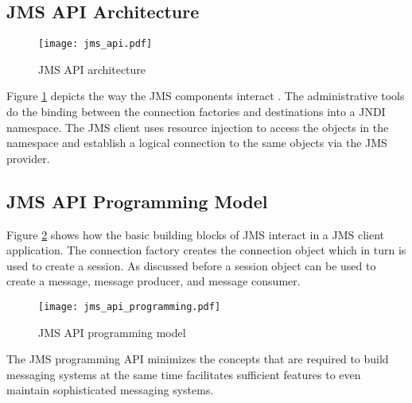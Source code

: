 \subsection {JMS API Architecture}
    \makeatletter
    \setlength{\intextsep}{20pt}
    \makeatother

    \begin{figure}[h!]
    \centering
    \texttt{[image: jms\_api.pdf]}
    \caption{JMS API architecture}\label{figures:jms_api}
    \end{figure}

    Figure \ref{figures:jms_api} depicts the way the JMS components interact \parencite{jms_api}. The administrative tools do the binding between the connection factories and destinations into a JNDI namespace.
    The JMS client uses resource injection to access the objects in the namespace and establish a logical connection to the same objects via the JMS provider. 


 \subsection {JMS API Programming Model}

Figure  \ref{figures:jms_api_programming} shows how the basic building blocks of JMS interact in a JMS client application. The connection factory creates the connection object which in turn is used to create a session. As discussed before a session object can be used to create a message, message producer, and message consumer.

    \begin{figure}[h!]
    \centering
    \texttt{[image: jms\_api\_programming.pdf]}
    \caption{JMS API programming model}\label{figures:jms_api_programming}
    \end{figure}

The JMS programming API minimizes the concepts that are required to build messaging systems at the same time facilitates sufficient features to even maintain sophisticated messaging systems.

